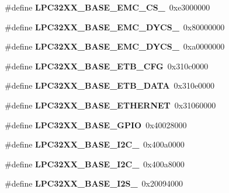 \begin{DoxyCompactItemize}
\#define {\bfseries L\+P\+C32\+X\+X\+\_\+\+B\+A\+S\+E\+\_\+\+E\+M\+C\+\_\+\+C\+S\+\_}~0xe3000000
\item 
\mbox{\label{group__lpc32xx__reg_gaa0fe1d2b9eb301e4228d5ba90a1c8bdc}} 
\#define {\bfseries L\+P\+C32\+X\+X\+\_\+\+B\+A\+S\+E\+\_\+\+E\+M\+C\+\_\+\+D\+Y\+C\+S\+\_}~0x80000000
\item 
\mbox{\label{group__lpc32xx__reg_gab49645d8cc216e74e1af7ba4f1cd0f4f}} 
\#define {\bfseries L\+P\+C32\+X\+X\+\_\+\+B\+A\+S\+E\+\_\+\+E\+M\+C\+\_\+\+D\+Y\+C\+S\+\_}~0xa0000000
\item 
\mbox{\label{group__lpc32xx__reg_gae83191808fe9004c7f645fa6ced07777}} 
\#define {\bfseries L\+P\+C32\+X\+X\+\_\+\+B\+A\+S\+E\+\_\+\+E\+T\+B\+\_\+\+C\+FG}~0x310c0000
\item 
\mbox{\label{group__lpc32xx__reg_gaa0e9ba5a11ad3f23aaf322c1d7e0f82c}} 
\#define {\bfseries L\+P\+C32\+X\+X\+\_\+\+B\+A\+S\+E\+\_\+\+E\+T\+B\+\_\+\+D\+A\+TA}~0x310e0000
\item 
\mbox{\label{group__lpc32xx__reg_ga4c410787604a585d0e2e6441f595c5e5}} 
\#define {\bfseries L\+P\+C32\+X\+X\+\_\+\+B\+A\+S\+E\+\_\+\+E\+T\+H\+E\+R\+N\+ET}~0x31060000
\item 
\mbox{\label{group__lpc32xx__reg_ga9a2b548fa7d7c47a403a1d90fc7b86f8}} 
\#define {\bfseries L\+P\+C32\+X\+X\+\_\+\+B\+A\+S\+E\+\_\+\+G\+P\+IO}~0x40028000
\item 
\mbox{\label{group__lpc32xx__reg_ga8192dbc0d5acb05fc8d2686ad07ba415}} 
\#define {\bfseries L\+P\+C32\+X\+X\+\_\+\+B\+A\+S\+E\+\_\+\+I2\+C\+\_}~0x400a0000
\item 
\mbox{\label{group__lpc32xx__reg_gadaafc3837cc54d721f011d58a2e8875c}} 
\#define {\bfseries L\+P\+C32\+X\+X\+\_\+\+B\+A\+S\+E\+\_\+\+I2\+C\+\_}~0x400a8000
\item 
\mbox{\label{group__lpc32xx__reg_ga260f2f511ae9c735ce1894735e4cc1be}} 
\#define {\bfseries L\+P\+C32\+X\+X\+\_\+\+B\+A\+S\+E\+\_\+\+I2\+S\+\_}~0x20094000

\end{DoxyCompactItemize}

